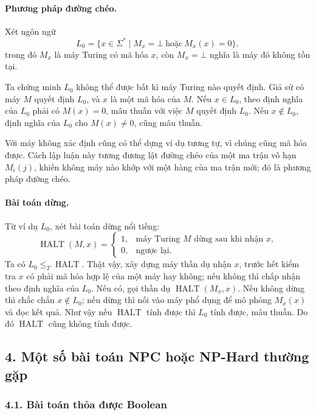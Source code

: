 \documentclass[11pt]{article}
\begin{document}
\paragraph{Phương pháp đường chéo.}
Xét ngôn ngữ
\[
  L_0=\{x\in\Sigma^*\mid M_x=\bot\ \text{hoặc}\ M_x(x)=0\},
\]
trong đó \(M_x\) là máy Turing có mã hóa \(x\), còn \(M_x=\bot\) nghĩa là máy
đó không tồn tại.

Ta chứng minh \(L_0\) không thể được bất kì máy Turing nào quyết định. Giả sử
có máy \(M\) quyết định \(L_0\), và \(x\) là một mã hóa của \(M\). Nếu \(x\in
L_0\), theo định nghĩa của \(L_0\) phải có \(M(x)=0\), mâu thuẫn với việc \(M\)
quyết định \(L_0\). Nếu \(x\notin L_0\), định nghĩa của \(L_0\) cho
\(M(x)\ne0\), cũng mâu thuẫn.

Với máy không xác định cũng có thể dựng ví dụ tương tự, vì chúng cũng mã hóa
được. Cách lập luận này tương đương lật đường chéo của một ma trận vô hạn
\(M_i(j)\), khiến không máy nào khớp với một hàng của ma trận mới; đó là
phương pháp đường chéo.

\paragraph{Bài toán dừng.}
Từ ví dụ \(L_0\), xét bài toán dừng nổi tiếng:
\[
  \operatorname{HALT}(M,x)=
  \begin{cases}
    1,& \text{máy Turing }M\text{ dừng sau khi nhận }x,\\
    0,& \text{ngược lại.}
  \end{cases}
\]
Ta có \(L_0\le_T\operatorname{HALT}\). Thật vậy, xây dựng máy thần dụ nhận
\(x\), trước hết kiểm tra \(x\) có phải mã hóa hợp lệ của một máy hay không;
nếu không thì chấp nhận theo định nghĩa của \(L_0\). Nếu có, gọi thần dụ
\(\operatorname{HALT}(M_x,x)\). Nếu không dừng thì chắc chắn \(x\notin L_0\);
nếu dừng thì nối vào máy phổ dụng để mô phỏng \(M_x(x)\) và đọc kết quả. Như
vậy nếu \(\operatorname{HALT}\) tính được thì \(L_0\) tính được, mâu thuẫn. Do
đó \(\operatorname{HALT}\) cũng không tính được.

\subsection*{4. Một số bài toán NPC hoặc NP-Hard thường gặp}

\subsubsection*{4.1. Bài toán thỏa được Boolean}
\end{document}
